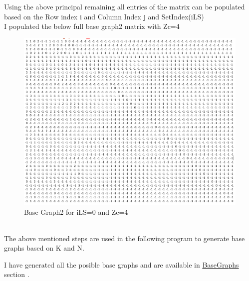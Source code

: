 \documentclass[journal,twocolumn]{IEEEtran}
\begin{document}
{{\begin{enumerate}
  Using the above principal remaining all entries of the matrix can be populated based on the Row index i and Column Index j and SetIndex(iLS)\\
  I populated the below full base graph2 matrix with Zc=4\\
  \vspace{20mm}
     \begin{figure}[h]
 \includegraphics[width=\columnwidth]{../figs/pcm.png}    
     \caption{Base Graph2 for iLS=0 and Zc=4}
  \end{figure}\\
  
  The above mentioned steps are used in the following program to generate base graphs based on K and N.\\
   \begin{center}
       \end{center}
      \vspace{2mm}  
I have generated all the posible base graphs and are available in {\href{https://github.com/KrishnaYadati/IIT-H-FWC-Project/tree/main/5G-NR-LDPC-Encoder/Base_Graphs}{BaseGraphs}} section .\\
  

\end{enumerate}}}
\end{document}
